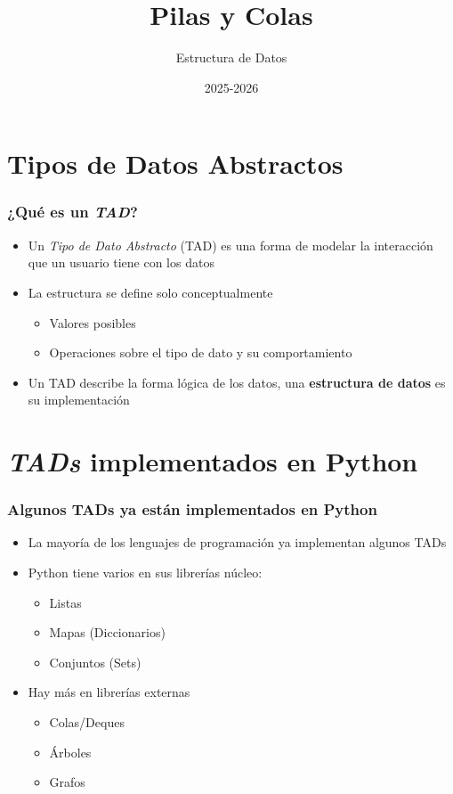 \documentclass[11pt]{beamer}
\author{Estructura de Datos}
\title{\huge{Pilas y Colas}}
\date[]{2025-2026}
\begin{document}
\begin{frame}[plain]
	\maketitle
\end{frame}

\begin{frame}
	\tableofcontents
\end{frame}

\section{Tipos de Datos Abstractos}

\begin{frame}\frametitle{¿Qué es un \textit{TAD}?}
\begin{itemize}
\item Un \textit{Tipo de Dato Abstracto} (TAD) es una forma de modelar la interacción que un usuario tiene con los datos
\item La estructura se define solo conceptualmente
    \begin{itemize}
    \item Valores posibles
    \item Operaciones sobre el tipo de dato y su comportamiento
    \end{itemize}
\item Un TAD describe la forma lógica de los datos, una \textbf{estructura de datos} es su implementación
\end{itemize}
\end{frame}

\section{\textit{TADs} implementados en Python}

\begin{frame}\frametitle{Algunos TADs ya están implementados en Python}
\begin{itemize}
\item La mayoría de los lenguajes de programación ya implementan algunos TADs
\item Python tiene varios en sus librerías núcleo:
    \begin{itemize}
    \item Listas
    \item Mapas (Diccionarios)
    \item Conjuntos (Sets)
    \end{itemize}
\item Hay más en librerías externas
    \begin{itemize}
    \item Colas/Deques
    \item Árboles
    \item Grafos
    \end{itemize}
\end{itemize}
\end{frame}
\end{document}
